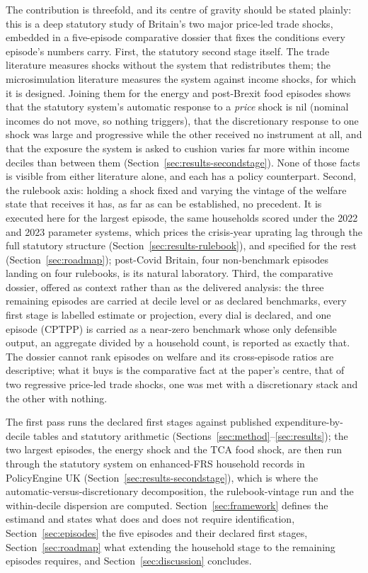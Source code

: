 The contribution is threefold, and its centre of gravity should be
stated plainly: this is a deep statutory study of Britain's two major
price-led trade shocks, embedded in a five-episode comparative
dossier that fixes the conditions every episode's numbers carry.
First, the statutory second stage itself. The trade literature
measures shocks without the system that redistributes them; the
microsimulation literature measures the system against income shocks,
for which it is designed. Joining them for the energy and post-Brexit
food episodes shows that the statutory system's automatic response to
a \emph{price} shock is nil (nominal incomes do not move, so nothing
triggers), that the discretionary response to one shock was large and
progressive while the other received no instrument at all, and that
the exposure the system is asked to cushion varies far more within
income deciles than between them
(Section~\ref{sec:results-secondstage}). None of those facts is
visible from either literature alone, and each has a policy
counterpart. Second, the rulebook axis: holding a shock fixed and
varying the vintage of the welfare state that receives it has, as far
as can be established, no precedent. It is executed here for the
largest episode, the same households scored under the 2022 and 2023
parameter systems, which prices the crisis-year uprating lag through
the full statutory structure (Section~\ref{sec:results-rulebook}),
and specified for the rest (Section~\ref{sec:roadmap}); post-Covid
Britain, four non-benchmark episodes landing on four rulebooks, is
its natural laboratory. Third, the comparative dossier, offered as
context rather than as the delivered analysis: the three remaining
episodes are carried at decile level or as declared benchmarks, every
first stage is labelled estimate or projection, every dial is
declared, and one episode (CPTPP) is carried as a near-zero benchmark
whose only defensible output, an aggregate divided by a household
count, is reported as exactly that. The dossier cannot rank episodes
on welfare and its cross-episode ratios are descriptive; what it buys
is the comparative fact at the paper's centre, that of two regressive
price-led trade shocks, one was met with a discretionary stack and
the other with nothing.

The first pass runs the declared first stages against published
expenditure-by-decile tables and statutory arithmetic
(Sections~\ref{sec:method}--\ref{sec:results}); the two largest episodes, the energy shock and the TCA food
shock, are then run through the statutory system on enhanced-FRS
household records in PolicyEngine UK
(Section~\ref{sec:results-secondstage}), which is where the
automatic-versus-discretionary decomposition, the rulebook-vintage
run and the within-decile dispersion are computed. Section~\ref{sec:framework}
defines the estimand and states what does and does not require
identification, Section~\ref{sec:episodes} the five episodes and their
declared first stages, Section~\ref{sec:roadmap} what extending the
household stage to the remaining episodes requires, and
Section~\ref{sec:discussion} concludes.
